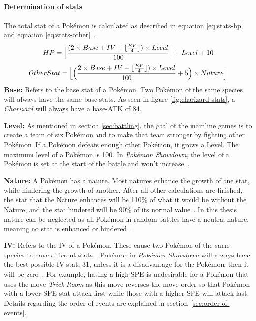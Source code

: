 \paragraph{Determination of stats}
\label{sec:stat-calculation}
The total stat of a Pokémon is calculated as described in equation \ref{eq:stats-hp} and equation 
\ref{eq:stats-other}~\autocite{Bulbapedia:Stat}.
\begin{equation}
	\label{eq:stats-hp}
	HP = \Bigl\lfloor \frac{(2 \times Base + IV + \lfloor \frac{EV}{4} \rfloor) \times Level}{100}\Bigr\rfloor
	+ Level + 10 \\
\end{equation}
\begin{equation}
	\label{eq:stats-other}
	OtherStat = \Bigl\lfloor \Big( \frac{2 \times Base + IV + \lfloor \frac{EV}{4} \rfloor) \times Level}
	{100} + 5\Big) \times Nature \Bigr\rfloor
\end{equation}
\textbf{Base:} Refers to the base stat of a Pokémon. Two Pokémon of the same species will always have the 
same base-stats. As seen in figure \ref{fig:charizard-stats}, a \textit{Charizard} will always have a
base-\ac{ATK} of 84.

\textbf{Level:} As mentioned in section \ref{sec:battling}, the goal of the mainline games is to create 
a team of six Pokémon and to make that team stronger by fighting other Pokémon. If a Pokémon defeats
enough other Pokémon, it grows a Level. The maximum level of a Pokémon is 100.
In \textit{Pokémon Showdown}, the level of  a Pokémon is set at the start of the battle and won't 
increase~\autocite{Smogon:RandBatsGuide}.

\textbf{Nature:} A Pokémon has a nature. Most natures enhance the growth of one stat, while hindering
the growth of another. After all other calculations are finished, the stat that the Nature enhances will
be 110\% of what it would be without the Nature, and the stat hindered will be 90\% of its normal 
value~\autocite{Bulbapedia:Stat}. In this thesis nature can be neglected as all Pokémon in random battles have
a neutral nature, meaning no stat is enhanced or hindered~\autocite{Smogon:RandBatsGuide}.

\textbf{IV:} Refers to the \ac{IV} of a Pokémon. These cause two Pokémon of the same species to have
different stats~\autocite{Bulbapedia:Stat}. Pokémon in \textit{Pokémon Showdown} will always have the best possible \ac{IV} 
stat, 31, unless it is a disadvantage for the Pokémon, then it will be zero~\autocite{Smogon:RandBatsGuide}.
For example, having a high \ac{SPE} is undesirable for a Pokémon that uses the move \textit{Trick Room} as this
move reverses the move order so that Pokémon with a lower \ac{SPE} stat attack first while those with a 
higher \ac{SPE} will attack last. Details regarding the order of events are explained 
in section~\ref{sec:order-of-events}.

